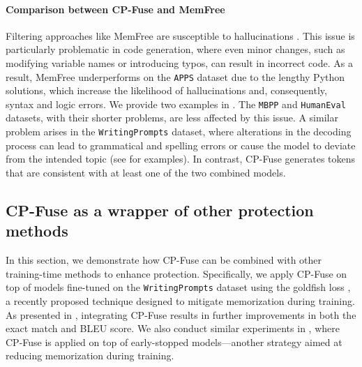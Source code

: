 \paragraph{Comparison between CP-Fuse and MemFree} Filtering approaches like MemFree are susceptible to hallucinations \citep{ippolito2023preventing, liu2024shield}. This issue is particularly problematic in code generation, where even minor changes, such as modifying variable names or introducing typos, can result in incorrect code. As a result, MemFree underperforms on the \texttt{APPS} dataset due to the lengthy Python solutions, which increase the likelihood of hallucinations and, consequently, syntax and logic errors. We provide two examples in . The \texttt{MBPP} and \texttt{HumanEval} datasets, with their shorter problems, are less affected by this issue. A similar problem arises in the \texttt{WritingPrompts} dataset, where alterations in the decoding process can lead to grammatical and spelling errors or cause the model to deviate from the intended topic (see  for examples). In contrast, CP-Fuse generates tokens that are consistent with at least one of the two combined models.









\subsection{CP-Fuse as a wrapper of other protection methods}
\label{sec:wraping_exps}

In this section, we demonstrate how CP-Fuse can be combined with other training-time methods to enhance protection. Specifically, we apply CP-Fuse on top of models fine-tuned on the \texttt{WritingPrompts} dataset using the goldfish loss \citep{hans2024like}, a recently proposed technique designed to mitigate memorization during training. As presented in , integrating CP-Fuse results in further improvements in both the exact match and BLEU score. We also conduct similar experiments in , where CP-Fuse is applied on top of early-stopped models—another strategy aimed at reducing memorization during training. 

